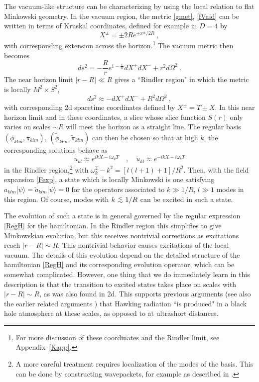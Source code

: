 \documentclass[11pt]{article}
\numberwithin{equation}{section}
\newcommand{\beq}{\begin{equation}}
\newcommand{\eeq}{\end{equation}}
\def\lesssim{~\mbox{\raisebox{-.6ex}{$\stackrel{<}{\sim}$}}~}
\begin{document}
The vacuum-like structure can be characterizing by using the local relation to flat Minkowski geometry.  In the vacuum region, the metric \eqref{gmet}, \eqref{fVaid} can be written in terms of Kruskal coordinates, defined for example  in $D=4$ by 
\beq\label{Krudef}
X^\pm = \pm 2R e^{\pm x^\pm/2R}\ ,
\eeq
with corresponding extension across the horizon.\footnote{For more discussion of these coordinates and the Rindler limit, see Appendix~\ref{Kapp}.} The vacuum metric then becomes
\beq \label{Krmet}
ds^2 = -\frac{R}{r}e^{1-\frac{r}{R}}dX^+ dX^- + r^2 d\Omega^2\ .
\eeq
The near horizon limit $|r-R|\ll R$ gives a ``Rindler region"\cite{GiLi3} in which the metric is locally $M^2 \times S^2$,
\beq\label{prodmet}
ds^2 \approx -dX^+ dX^- + R^2 d\Omega^2\ ,
\eeq
 with corresponding 2d spacetime coordinates defined by $X^\pm = T\pm X$.  In this near horizon limit and in these coordinates, a slice whose slice function $S(r)$ only varies on scales $\sim R$ will meet the horizon as a straight line.  The regular basis $(\phi_{klm},\pi_{klm})$, $(\tilde \phi_{klm},\tilde \pi_{klm})$ can then be chosen so that at high $k$, the corresponding solutions behave as
 \beq\label{KruskalModes}
 u_{kl}\approx e^{ikX-i\omega_k T}\quad , \quad \tilde u_{kl}\approx e^{-ikX-i\omega_k T}
 \eeq
 in the Rindler region,\footnote{A more careful treatment requires localization of the modes of the basis.  This can be done by constructing wavepackets, for example as described in \cite{Hawk}\cite{GiNe}\cite{SE2d}.} with $\omega_k^2-k^2=[l(l+1)+1]/R^2$.  Then, with the field expansion \eqref{Fexp}, a state which is locally Minkowski is one satisfying $a_{klm}|\psi\rangle=\tilde a_{klm}|\psi\rangle=0$ for the operators associated to $k\gg 1/R$, $l\gg 1$ modes in this region.  Of course, modes with $k\lesssim 1/R$ can be excited in such a state.
 
The evolution of such a state is in general governed by the regular expression \eqref{RegH} for the hamiltonian.  In the Rindler region this simplifies to give Minkowskian evolution, but this receives nontrivial corrections as excitations reach $|r-R|\sim R$.  This nontrivial behavior causes excitations of the local vacuum.  The details of this evolution depend on the detailed structure of the hamiltonian \eqref{RegH} and its corresponding evolution operator, which can be somewhat complicated.  However, one thing that we do immediately learn in this description is that the transition to excited states takes place on scales with $|r-R|\sim R$, as was also found in 2d\cite{SEHS,SE2d}.  This supports previous arguments\cite{SGBoltz} (see also the earlier related arguments \cite{Unru-origin,Full,Bard}) that Hawking radiation ``is produced" in a black hole atmosphere at these scales, as opposed to at ultrashort distances.  
\end{document}
